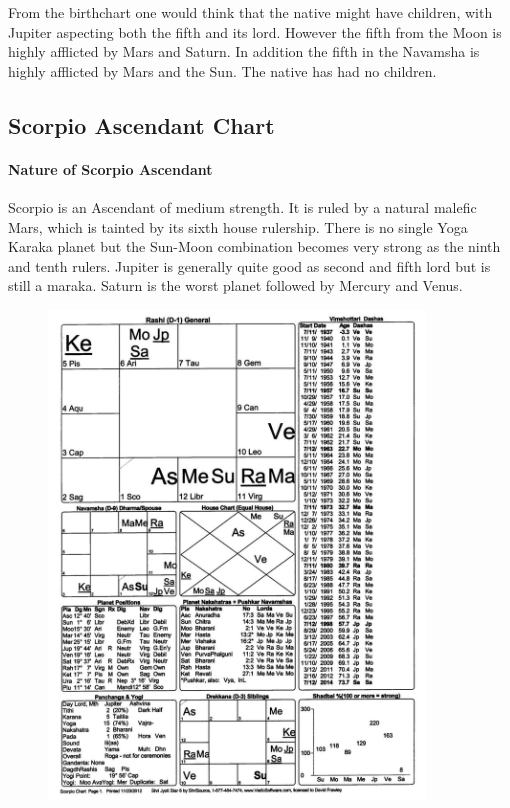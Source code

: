  

From the birthchart one would think that the native might have children, with Jupiter aspecting both the fifth and its lord. However the fifth from the Moon is highly afflicted by Mars and Saturn. In addition the fifth in the Navamsha is highly afflicted by Mars and the Sun. The native has had no children.

 

\subsection{Scorpio Ascendant Chart}
 

\paragraph{Nature of Scorpio Ascendant}

 

Scorpio is an Ascendant of medium strength. It is ruled by a natural malefic Mars, which is tainted by its sixth house rulership. There is no single Yoga Karaka planet but the Sun-Moon combination becomes very strong as the ninth and tenth rulers. Jupiter is generally quite good as second and fifth lord but is still a maraka. Saturn is the worst planet followed by Mercury and Venus.

 
\begin{figure}[h]
\centering
\includegraphics[width=10cm]{pics/Scorpio-Ascendant.jpg}
\caption{}
\end{figure}
 


